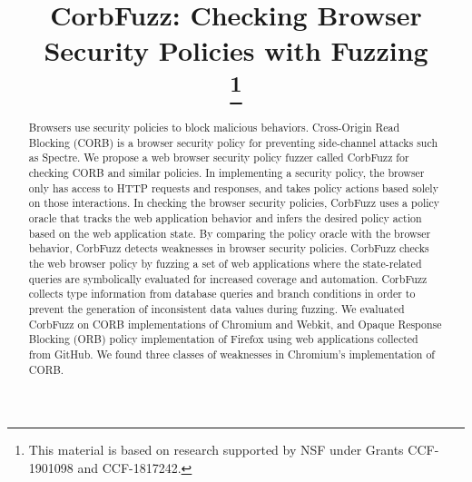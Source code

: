 \documentclass[10pt,conference]{IEEEtran}
\author{
    \IEEEauthorblockN{Chaofan Shou, İsmet Burak Kadron, Qi Su, and Tevfik Bultan}
    \IEEEauthorblockA{University of California, Santa Barbara
    \\\{shou, kadron, qisu, bultan\}@cs.ucsb.edu}

}
\begin{document}
\title{CorbFuzz: Checking Browser Security Policies with Fuzzing\\
\thanks{This material is based on research supported by NSF under Grants CCF-1901098 and CCF-1817242.}
}

\maketitle

\begin{abstract}
Browsers use security policies to block malicious behaviors. Cross-Origin Read Blocking (CORB) is a browser security policy for preventing side-channel attacks such as Spectre. We propose a web browser security policy fuzzer called CorbFuzz for checking CORB and similar policies. In implementing a security policy, the browser only has access to HTTP requests and responses, and takes policy actions based solely on those interactions. In checking the browser security policies, CorbFuzz uses a policy oracle that tracks the web application behavior and infers the desired policy action based on the web application state. By comparing the policy oracle with the browser behavior, CorbFuzz detects weaknesses in browser security policies. CorbFuzz checks the web browser policy by fuzzing a set of web applications where the state-related queries are symbolically evaluated for increased coverage and automation. CorbFuzz collects type information from database queries and branch conditions in order to prevent the generation of inconsistent data values during fuzzing. We evaluated CorbFuzz on CORB implementations of Chromium and Webkit, and Opaque Response Blocking (ORB) policy implementation of Firefox using web applications collected from GitHub. We found three classes of weaknesses in Chromium's implementation of CORB. 







\end{abstract}
\end{document}
